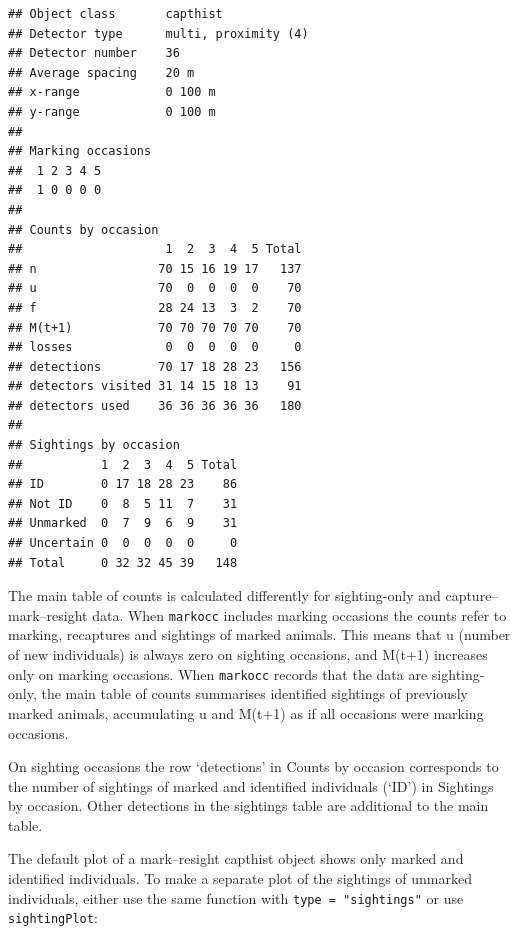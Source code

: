 \documentclass[
]{book}
\begin{document}
\begin{verbatim}
## Object class       capthist 
## Detector type      multi, proximity (4) 
## Detector number    36 
## Average spacing    20 m 
## x-range            0 100 m 
## y-range            0 100 m 
## 
## Marking occasions
##  1 2 3 4 5
##  1 0 0 0 0
## 
## Counts by occasion 
##                    1  2  3  4  5 Total
## n                 70 15 16 19 17   137
## u                 70  0  0  0  0    70
## f                 28 24 13  3  2    70
## M(t+1)            70 70 70 70 70    70
## losses             0  0  0  0  0     0
## detections        70 17 18 28 23   156
## detectors visited 31 14 15 18 13    91
## detectors used    36 36 36 36 36   180
## 
## Sightings by occasion 
##           1  2  3  4  5 Total
## ID        0 17 18 28 23    86
## Not ID    0  8  5 11  7    31
## Unmarked  0  7  9  6  9    31
## Uncertain 0  0  0  0  0     0
## Total     0 32 32 45 39   148
\end{verbatim}

The main table of counts is calculated differently for sighting-only and capture--mark--resight data. When \texttt{markocc} includes marking occasions the counts refer to marking, recaptures and sightings of marked animals. This means that u (number of new individuals) is always zero on sighting occasions, and M(t+1) increases only on marking occasions. When \texttt{markocc} records that the data are sighting-only, the main table of counts summarises identified sightings of previously marked animals, accumulating u and M(t+1) as if all occasions were marking occasions.

On sighting occasions the row `detections' in Counts by occasion corresponds to the number of sightings of marked and identified individuals (`ID') in Sightings by occasion. Other detections in the sightings table are additional to the main table.

The default plot of a mark--resight capthist object shows only marked and identified individuals. To make a separate plot of the sightings of unmarked individuals, either use the same function with \texttt{type\ =\ "sightings"} or use \texttt{sightingPlot}:
\end{document}
